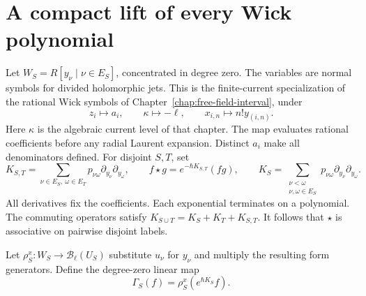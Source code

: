 \section{A compact lift of every Wick polynomial}

Let $W_S=R[y_\nu\mid\nu\in E_S]$, concentrated in degree zero.
The variables are normal symbols for divided holomorphic jets.
This is the finite-current specialization of the rational Wick
symbols of Chapter~\ref{chap:free-field-interval}, under
\[
 z_i\longmapsto a_i,\qquad \kappa\longmapsto-\ell,\qquad
 x_{i,n}\longmapsto n!y_{(i,n)}.
\]
Here $\kappa$ is the algebraic current level of that chapter.
The map evaluates rational coefficients before any radial Laurent
expansion.  Distinct $a_i$ make all denominators defined.
For disjoint $S,T$, set
\[
 K_{S,T}=\sum_{\nu\in E_S,\ \omega\in E_T}
       p_{\nu\omega}\partial_{y_\nu}\partial_{y_\omega},\qquad
 f\star g=e^{-\hbar K_{S,T}}(fg),
 \qquad
 K_S=\sum_{\substack{\nu<\omega\\\nu,\omega\in E_S}}
       p_{\nu\omega}\partial_{y_\nu}\partial_{y_\omega}.
\]
All derivatives fix the coefficients.  Each exponential terminates
on a polynomial.  The commuting operators satisfy
$K_{S\cup T}=K_S+K_T+K_{S,T}$.
It follows that $\star$ is associative on pairwise disjoint labels.

Let $\rho_S^x:W_S\to\mathcal B_\ell(U_S)$ substitute $u_\nu$ for
$y_\nu$ and multiply the resulting form generators.
Define the degree-zero linear map
\begin{equation}
\label{eq:ordered-current-Gamma}
 \Gamma_S(f)=\rho_S^x(e^{\hbar K_S}f).
\end{equation}

